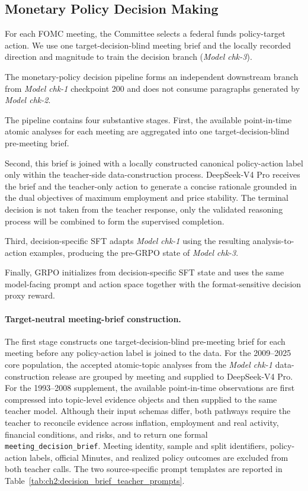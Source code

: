 
\subsection*{Monetary Policy Decision Making}

For each FOMC meeting, the Committee selects a federal funds policy-target action. We use one target-decision-blind meeting brief and the locally recorded direction and magnitude to train the  decision branch (\textit{Model chk-3}).


The monetary-policy decision pipeline forms an independent downstream branch from \textit{Model chk-1} checkpoint 200 and does not consume paragraphs generated by \textit{Model chk-2}. 


The pipeline contains four substantive stages. First, the available point-in-time atomic analyses for each meeting are aggregated into one target-decision-blind pre-meeting brief. 


Second, this brief is joined with a locally constructed canonical policy-action label only within the teacher-side data-construction process. DeepSeek-V4 Pro receives the brief and the teacher-only action to generate a concise rationale grounded in the dual objectives of maximum employment and price stability. The terminal decision is not taken from the teacher response, only the validated reasoning process will be combined to form the supervised completion. 

Third, decision-specific SFT adapts \textit{Model chk-1} using the resulting analysis-to-action examples, producing the pre-GRPO state of \textit{Model chk-3}. 


Finally, GRPO initializes from  decision-specific SFT state and
uses the same model-facing prompt and action space together with the format-sensitive decision proxy reward. 


\paragraph*{Target-neutral meeting-brief construction.}

The first stage constructs one target-decision-blind pre-meeting brief for each meeting before any policy-action label is joined to the data. For the 2009--2025 core population, the accepted atomic-topic analyses from the \textit{Model chk-1} data-construction release are grouped by meeting and supplied to DeepSeek-V4 Pro. For the 1993--2008 supplement, the available point-in-time observations are first compressed into topic-level evidence objects and then supplied to the same teacher model. Although their input schemas differ, both pathways require the teacher to reconcile evidence across inflation, employment and real activity, financial conditions, and risks, and to return one formal \texttt{meeting\_decision\_brief}. Meeting identity, sample and split identifiers, policy-action labels, official Minutes, and realized policy outcomes are excluded from both teacher calls. The two source-specific prompt templates are reported in Table~\ref{tab:ch2:decision_brief_teacher_prompts}.

